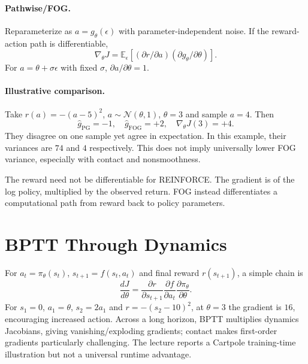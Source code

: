 \paragraph{Pathwise/FOG.}
Reparameterize as $a=g_\theta(\epsilon)$ with parameter-independent noise. If the reward-action path is differentiable,
\[
\nabla_\theta J=\mathbb E_\epsilon[
(\partial r/\partial a)(\partial g_\theta/\partial\theta)].
\]
For $a=\theta+\sigma\epsilon$ with fixed $\sigma$, $\partial a/\partial\theta=1$.

\paragraph{Illustrative comparison.}
Take $r(a)=-(a-5)^2$, $a\sim\mathcal N(\theta,1)$, $\theta=3$ and sample $a=4$. Then
\[
\hat g_{\mathrm{PG}}=-1,\quad
\hat g_{\mathrm{FOG}}=+2,\quad
\nabla_\theta J(3)=+4.
\]
They disagree on one sample yet agree in expectation. In this example, their variances are $74$ and $4$ respectively. This does not imply universally lower FOG variance, especially with contact and nonsmoothness.

\begin{pitfall}
The reward need not be differentiable for REINFORCE. The gradient is of the log policy, multiplied by the observed return. FOG instead differentiates a computational path from reward back to policy parameters.
\end{pitfall}

\section{BPTT Through Dynamics}
For $a_t=\pi_\theta(s_t)$, $s_{t+1}=f(s_t,a_t)$ and final reward $r(s_{t+1})$, a simple chain is
\[
\frac{dJ}{d\theta}
=\frac{\partial r}{\partial s_{t+1}}
\frac{\partial f}{\partial a_t}
\frac{\partial \pi_\theta}{\partial\theta}.
\]
For $s_1=0$, $a_1=\theta$, $s_2=2a_1$ and $r=-(s_2-10)^2$, at $\theta=3$ the gradient is $16$, encouraging increased action. Across a long horizon, BPTT multiplies dynamics Jacobians, giving vanishing/exploding gradients; contact makes first-order gradients particularly challenging. The lecture reports a Cartpole training-time illustration but not a universal runtime advantage.


